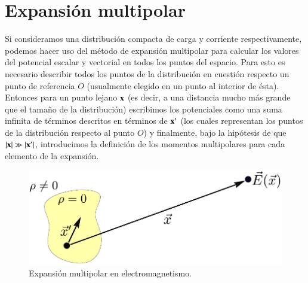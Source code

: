 \section{Expansión multipolar}
\label{sec:2}

Si consideramos una distribución compacta de carga y corriente respectivamente, podemos hacer uso del método de expansión multipolar para calcular los valores del potencial escalar y vectorial en todos los puntos del espacio. Para esto es necesario describir todos los puntos de la distribución en cuestión respecto un punto de referencia $O$ (usualmente elegido en un punto al interior de ésta). Entonces para un punto lejano $\vb{x}$ (es decir, a una distancia mucho más grande que el tamaño de la distribución) escribimos los potenciales como una suma infinita de términos descritos en términos de $\vb{x}'$ (los cuales representan los puntos de la distribución respecto al punto $O$) y finalmente, bajo la hipótesis de que $|\vb{x}| \gg |\vb{x}'|$, introducimos la definición de los momentos multipolares para cada elemento de la expansión.
\begin{figure}[h!]
\centering
\includegraphics[scale=1]{images/multipolar.pdf}
\caption[Expansión multipolar electromagnética]{Expansión multipolar en electromagnetismo.}
\end{figure}

